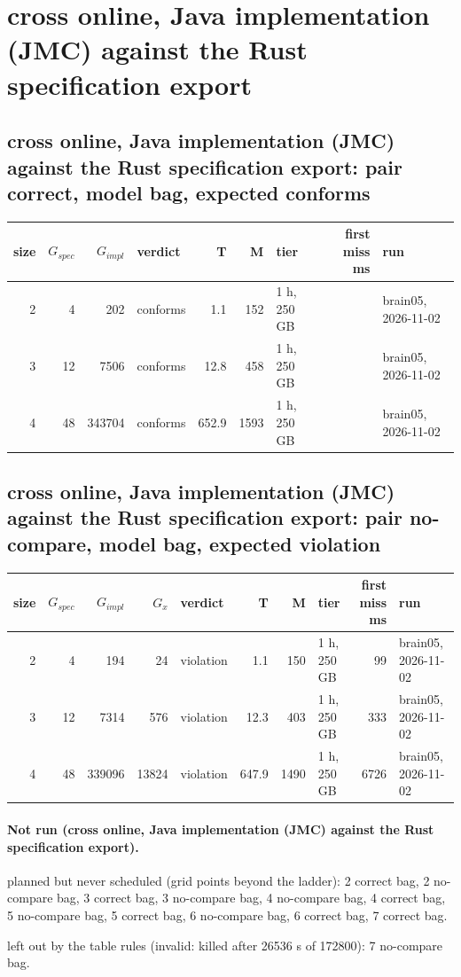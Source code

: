\documentclass[10pt]{article}
\begin{document}
\section*{cross online, Java implementation (JMC) against the Rust specification export}
\subsection*{cross online, Java implementation (JMC) against the Rust specification export: pair \textsf{correct}, model bag, expected conforms}
\begin{longtable}{@{}rrrlrrlrl@{}}
\toprule
size & $G_{\mathit{spec}}$ & $G_{\mathit{impl}}$ & verdict & T & M & tier & first miss ms & run \\
\midrule
\endhead
\color{red} 2 & 4 & 202 & conforms & 1.1 & 152 & 1 h, 250 GB &  & brain05, 2026-11-02 \\
\color{red} 3 & 12 & 7506 & conforms & 12.8 & 458 & 1 h, 250 GB &  & brain05, 2026-11-02 \\
\color{red} 4 & 48 & 343704 & conforms & 652.9 & 1593 & 1 h, 250 GB &  & brain05, 2026-11-02 \\
\bottomrule
\end{longtable}
\subsection*{cross online, Java implementation (JMC) against the Rust specification export: pair \textsf{no-compare}, model bag, expected violation}
\begin{longtable}{@{}rrrrlrrlrl@{}}
\toprule
size & $G_{\mathit{spec}}$ & $G_{\mathit{impl}}$ & $G_x$ & verdict & T & M & tier & first miss ms & run \\
\midrule
\endhead
\color{red} 2 & 4 & 194 & 24 & violation & 1.1 & 150 & 1 h, 250 GB & 99 & brain05, 2026-11-02 \\
\color{red} 3 & 12 & 7314 & 576 & violation & 12.3 & 403 & 1 h, 250 GB & 333 & brain05, 2026-11-02 \\
\color{red} 4 & 48 & 339096 & 13824 & violation & 647.9 & 1490 & 1 h, 250 GB & 6726 & brain05, 2026-11-02 \\
\bottomrule
\end{longtable}
\paragraph{Not run (cross online, Java implementation (JMC) against the Rust specification export).}
planned but never scheduled (grid points beyond the ladder): 2 correct bag, 2 no-compare bag, 3 correct bag, 3 no-compare bag, 4 no-compare bag, 4 correct bag, 5 no-compare bag, 5 correct bag, 6 no-compare bag, 6 correct bag, 7 correct bag.\par
left out by the table rules (invalid: killed after 26536 s of 172800): 7 no-compare bag.\par
\end{document}
